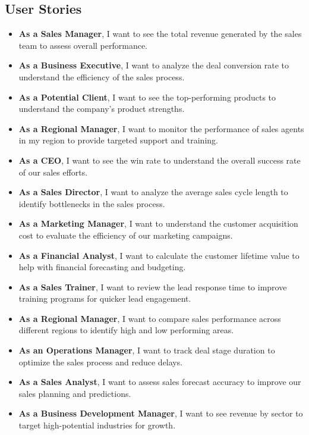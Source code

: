 \documentclass{article}
\begin{document}
\subsection{User Stories}
\begin{itemize}
    \item \textbf{As a Sales Manager}, I want to see the total revenue generated by the sales team to assess overall performance.
    \item \textbf{As a Business Executive}, I want to analyze the deal conversion rate to understand the efficiency of the sales process.
    \item \textbf{As a Potential Client}, I want to see the top-performing products to understand the company’s product strengths.
    \item \textbf{As a Regional Manager}, I want to monitor the performance of sales agents in my region to provide targeted support and training.
    \item \textbf{As a CEO}, I want to see the win rate to understand the overall success rate of our sales efforts.
    \item \textbf{As a Sales Director}, I want to analyze the average sales cycle length to identify bottlenecks in the sales process.
    \item \textbf{As a Marketing Manager}, I want to understand the customer acquisition cost to evaluate the efficiency of our marketing campaigns.
    \item \textbf{As a Financial Analyst}, I want to calculate the customer lifetime value to help with financial forecasting and budgeting.
    \item \textbf{As a Sales Trainer}, I want to review the lead response time to improve training programs for quicker lead engagement.
    \item \textbf{As a Regional Manager}, I want to compare sales performance across different regions to identify high and low performing areas.
    \item \textbf{As an Operations Manager}, I want to track deal stage duration to optimize the sales process and reduce delays.
    \item \textbf{As a Sales Analyst}, I want to assess sales forecast accuracy to improve our sales planning and predictions.
    \item \textbf{As a Business Development Manager}, I want to see revenue by sector to target high-potential industries for growth.
\end{itemize}
\end{document}
